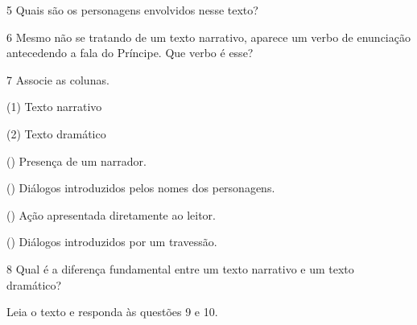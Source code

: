 \num{5} Quais são os personagens envolvidos nesse texto?


\num{6} Mesmo não se tratando de um texto narrativo, aparece um verbo de enunciação antecedendo a fala do Príncipe. Que verbo é esse?


\num{7} Associe as colunas.

{\setlength{\columnsep}{-5cm}
\begin{multicols}{2}
(1) Texto narrativo

(2) Texto dramático

\columnbreak

({}) Presença de um narrador.

({}) Diálogos introduzidos pelos nomes dos personagens.

({}) Ação apresentada diretamente ao leitor.

({}) Diálogos introduzidos por um travessão.
\end{multicols}
}

\num{8} Qual é a diferença fundamental entre um texto narrativo e um texto dramático?


\pagebreak

Leia o texto e responda às questões 9 e 10.\bigskip\bigskip

